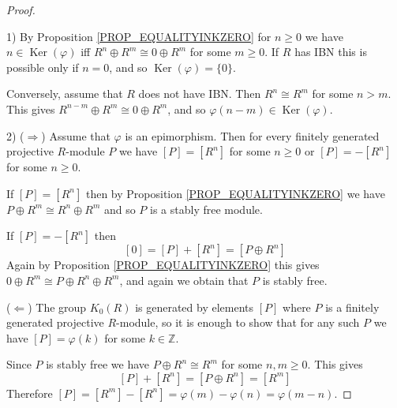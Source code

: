 \documentclass[12pt, letterpaper, oneside]{article}
\theoremstyle{plain}
\theoremstyle{definition}
\newcommand{\Z}{{\mathbb Z}}
\newcommand{\Ker}{\operatorname{Ker}}
\newcommand{\vs}{\vskip 5mm}
\begin{document}
\begin{proof}\ 

1)  By Proposition \ref{PROP_EQUALITYINKZERO} for $n\geq 0$ we have 
$n\in \Ker(\varphi)$ iff $R^{n} \oplus R^{m} \cong 0 \oplus R^{m}$ for some 
$m\geq 0$. If $R$ has IBN this is possible only if $n=0$, and so $\Ker(\varphi) = \{0\}$.

Conversely, assume that $R$ does not have IBN. Then $R^{n}\cong R^{m}$ for some $n>m$. 
This gives $R^{n-m} \oplus R^{m} \cong 0 \oplus R^{m}$, and so $\varphi(n-m) \in \Ker(\varphi)$.

\vs

2) ($\Rightarrow$) Assume that $\varphi$ is an epimorphism. Then for every finitely 
generated projective $R$-module $P$ we have $[P] = [R^{n}]$ for some $n\geq 0$ or 
$[P] = -[R^{n}]$ for some $n\geq 0$. 

If $[P] = [R^{n}]$  then  by Proposition \ref{PROP_EQUALITYINKZERO} we have 
$P\oplus R^{m} \cong R^{n}\oplus R^{m}$ and so $P$ is a stably free module. 

If $[P] = -[R^{n}]$ then 
$$[0] = [P]+ [R^{n}] = [P\oplus R^{n}]$$ 
Again by Proposition \ref{PROP_EQUALITYINKZERO} this gives 
$0\oplus R^{m} \cong P\oplus R^{n}\oplus R^{m}$, and again we obtain that 
$P$ is stably free. 

\vs


($\Leftarrow$) The group $K_{0}(R)$ is generated by elements $[P]$ where 
$P$ is a finitely generated projective $R$-module, so it is enough to show that 
for any such $P$ we have $[P] = \varphi(k)$ for some $k\in \Z$. 

Since $P$ is stably free we have $P\oplus R^{n}\cong R^{m}$ for some $n, m \geq 0$. 
This gives 
$$[P] + [R^{n}] = [P\oplus R^{n}] = [R^{m}]$$
Therefore $[P] = [R^{m}] -[R^{n}]  = \varphi(m) - \varphi(n) = \varphi(m-n)$.

\end{proof}



\vs\vs
\end{document}

